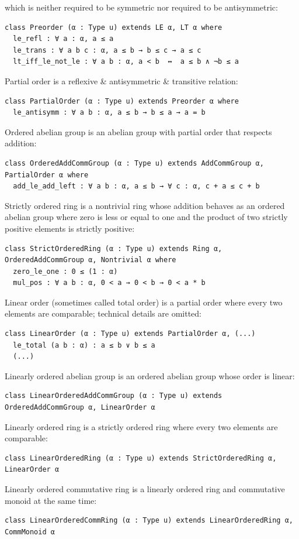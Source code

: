 \documentclass[]{article}
\renewcommand{\.}{\hskip .75pt}
\begin{document}
which is neither required to be symmetric nor required to be antisymmetric:
\begin{lstlisting}
class Preorder (α : Type u) extends LE α, LT α where
  le_refl : ∀ a : α, a ≤ a
  le_trans : ∀ a b c : α, a ≤ b → b ≤ c → a ≤ c
  lt_iff_le_not_le : ∀ a b : α, a < b  ↔  a ≤ b ∧ ¬b ≤ a 
\end{lstlisting}
Partial order is a reflexive \& antisymmetric \& transitive relation:
\begin{lstlisting}
class PartialOrder (α : Type u) extends Preorder α where
  le_antisymm : ∀ a b : α, a ≤ b → b ≤ a → a = b
\end{lstlisting}
Ordered abelian group is an abelian group with partial order that respects addition:
\begin{lstlisting}
class OrderedAddCommGroup (α : Type u) extends AddCommGroup α, PartialOrder α where
  add_le_add_left : ∀ a b : α, a ≤ b → ∀ c : α, c + a ≤ c + b
\end{lstlisting}
Strictly ordered ring is a nontrivial ring whose addition behaves as an ordered abelian group
where zero is less or equal to one and the product of two strictly positive elements is strictly positive:
\begin{lstlisting}
class StrictOrderedRing (α : Type u) extends Ring α, OrderedAddCommGroup α, Nontrivial α where
  zero_le_one : 0 ≤ (1 : α)
  mul_pos : ∀ a b : α, 0 < a → 0 < b → 0 < a * b
\end{lstlisting}
Linear order (sometimes called total order) is a partial order where every two elements are comparable;
technical details are omitted:
\begin{lstlisting}
class LinearOrder (α : Type u) extends PartialOrder α, (...)
  le_total (a b : α) : a ≤ b ∨ b ≤ a
  (...)
\end{lstlisting}
Linearly ordered abelian group is an ordered abelian group whose order is linear:
\begin{lstlisting}
class LinearOrderedAddCommGroup (α : Type u) extends OrderedAddCommGroup α, LinearOrder α
\end{lstlisting}
Linearly ordered ring is a strictly ordered ring where every two elements are comparable:
\begin{lstlisting}
class LinearOrderedRing (α : Type u) extends StrictOrderedRing α, LinearOrder α
\end{lstlisting}
Linearly ordered commutative ring is a linearly ordered ring and commutative monoid at the same time:
\begin{lstlisting}
class LinearOrderedCommRing (α : Type u) extends LinearOrderedRing α, CommMonoid α
\end{lstlisting}
\end{document}
